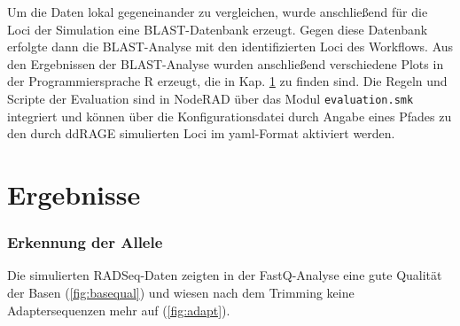 Um die Daten lokal gegeneinander zu vergleichen, wurde anschließend für die Loci der Simulation eine BLAST-Datenbank erzeugt. Gegen diese Datenbank erfolgte dann die BLAST-Analyse mit den identifizierten Loci des Workflows. Aus den Ergebnissen der BLAST-Analyse wurden anschließend verschiedene Plots in der Programmiersprache R erzeugt, die in Kap. \ref{sec:res} zu finden sind. Die Regeln und Scripte der Evaluation sind in NodeRAD über das Modul \lstinline|evaluation.smk| integriert und können über die Konfigurationsdatei durch Angabe eines Pfades zu den durch ddRAGE simulierten Loci im yaml-Format aktiviert werden.

\section{Ergebnisse} \label{sec:res}
\subsubsection{Erkennung der Allele} \label{subsubsec:res_alleles}

Die simulierten RADSeq-Daten zeigten in der FastQ-Analyse eine gute Qualität der Basen (\autoref{fig:basequal}) und wiesen nach dem Trimming keine Adaptersequenzen mehr auf (\autoref{fig:adapt}).\\

